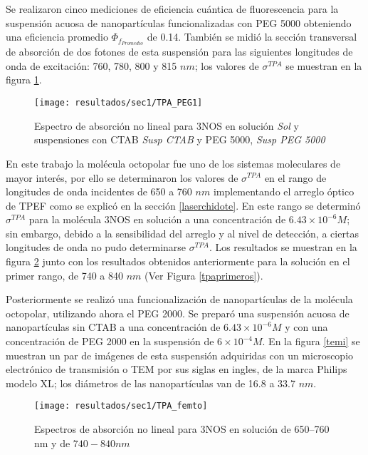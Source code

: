 Se realizaron cinco mediciones de eficiencia cu\'antica de fluorescencia para la suspensi\'on acuosa de nanopart\'iculas funcionalizadas con PEG 5000 obteniendo una eficiencia promedio $\Phi_{f_{Promedio}}$ de 0.14. Tambi\'en se midi\'o la secci\'on transversal de absorci\'on de dos fotones de esta suspensi\'on para las siguientes longitudes de onda de excitaci\'on: 760, 780, 800 y 815 $nm$; los valores de $\sigma^{TPA}$ se muestran en la figura \ref{valoressigmapeg1}.

\begin{figure}[H]
\centering
\texttt{[image: resultados/sec1/TPA\_PEG1]}
\caption{Espectro de absorci\'on no lineal para 3NOS en soluci\'on \emph{Sol} y suspensiones con CTAB \emph{Susp CTAB} y PEG 5000, \emph{Susp PEG 5000}}\label{valoressigmapeg1}
\end{figure}

En este trabajo la mol\'ecula octopolar fue uno de los sistemas moleculares  de mayor inter\'es, por ello se determinaron los valores de $\sigma^{TPA}$ en el rango de longitudes de onda incidentes de 650 a 760 $nm$ implementando el arreglo \'optico de TPEF como se explic\'o en la secci\'on \ref{laserchidote}. En este rango se determin\'o $\sigma^{TPA}$ para la mol\'ecula 3NOS en soluci\'on a una concentraci\'on de $6.43 \times 10^{-6} M$; sin embargo, debido a la sensibilidad del arreglo y al nivel de detecci\'on, a ciertas longitudes de onda no pudo determinarse $\sigma^{TPA}$. Los resultados se muestran en la figura \ref{valoressigmafs} junto con los resultados obtenidos anteriormente para la soluci\'on en el primer rango, de 740 a 840 $nm$ (Ver Figura \ref{tpaprimeros}).

Posteriormente se realiz\'o una funcionalizaci\'on de nanopart\'iculas de la mol\'ecula octopolar, utilizando ahora el PEG 2000. Se prepar\'o una suspensi\'on acuosa de nanopart\'iculas sin CTAB a una concentraci\'on de $6.43 \times 10^{-6} M$ y con una concentraci\'on de PEG 2000 en la suspensi\'on de $6\times 10^{-4} M$. En la figura \ref{temi} se muestran un par de im\'agenes de esta suspensi\'on adquiridas con un microscopio electr\'onico de transmisi\'on o TEM por sus siglas en ingles, de la marca Philips modelo XL; los di\'ametros de las nanopart\'iculas van de 16.8 a 33.7 $nm$. 


\begin{figure}[H]
\centering
\texttt{[image: resultados/sec1/TPA\_femto]}
\caption{Espectros de absorci\'on no lineal para 3NOS en soluci\'on de 650--760 nm y de $740-840nm$}\label{valoressigmafs}
\end{figure}

